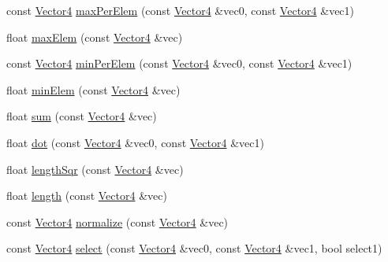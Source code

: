 \begin{DoxyCompactItemize}
\item 
const \hyperlink{classVectormath_1_1Aos_1_1Vector4}{Vector4} \hyperlink{namespaceVectormath_1_1Aos_acc5116f1d01a0eb82962da1f0c7cc8cd}{max\-Per\-Elem} (const \hyperlink{classVectormath_1_1Aos_1_1Vector4}{Vector4} \&vec0, const \hyperlink{classVectormath_1_1Aos_1_1Vector4}{Vector4} \&vec1)
\item 
float \hyperlink{namespaceVectormath_1_1Aos_aa77b5f3554c1c90a026822a2bc6d6099}{max\-Elem} (const \hyperlink{classVectormath_1_1Aos_1_1Vector4}{Vector4} \&vec)
\item 
const \hyperlink{classVectormath_1_1Aos_1_1Vector4}{Vector4} \hyperlink{namespaceVectormath_1_1Aos_a9479215fd73b2b9167592d20de674cec}{min\-Per\-Elem} (const \hyperlink{classVectormath_1_1Aos_1_1Vector4}{Vector4} \&vec0, const \hyperlink{classVectormath_1_1Aos_1_1Vector4}{Vector4} \&vec1)
\item 
float \hyperlink{namespaceVectormath_1_1Aos_a12da89eb2bd44d5c87e1c41477376c40}{min\-Elem} (const \hyperlink{classVectormath_1_1Aos_1_1Vector4}{Vector4} \&vec)
\item 
float \hyperlink{namespaceVectormath_1_1Aos_aa7a036f3d08ba2e6a77257db3a110cc1}{sum} (const \hyperlink{classVectormath_1_1Aos_1_1Vector4}{Vector4} \&vec)
\item 
float \hyperlink{namespaceVectormath_1_1Aos_afb1170eee384ba2fc342f146db07de4d}{dot} (const \hyperlink{classVectormath_1_1Aos_1_1Vector4}{Vector4} \&vec0, const \hyperlink{classVectormath_1_1Aos_1_1Vector4}{Vector4} \&vec1)
\item 
float \hyperlink{namespaceVectormath_1_1Aos_a2e61aace8e13cb862c01c6ccf1020420}{length\-Sqr} (const \hyperlink{classVectormath_1_1Aos_1_1Vector4}{Vector4} \&vec)
\item 
float \hyperlink{namespaceVectormath_1_1Aos_a64d2df548ee96963ba96b64e734c3779}{length} (const \hyperlink{classVectormath_1_1Aos_1_1Vector4}{Vector4} \&vec)
\item 
const \hyperlink{classVectormath_1_1Aos_1_1Vector4}{Vector4} \hyperlink{namespaceVectormath_1_1Aos_aba93aa4e8c32e41632de70c7ef9f33b5}{normalize} (const \hyperlink{classVectormath_1_1Aos_1_1Vector4}{Vector4} \&vec)
\item 
const \hyperlink{classVectormath_1_1Aos_1_1Vector4}{Vector4} \hyperlink{namespaceVectormath_1_1Aos_a7ba580ef317c15ad7fd69aef9fcb1f1a}{select} (const \hyperlink{classVectormath_1_1Aos_1_1Vector4}{Vector4} \&vec0, const \hyperlink{classVectormath_1_1Aos_1_1Vector4}{Vector4} \&vec1, bool select1)
\item 

\end{DoxyCompactItemize}

